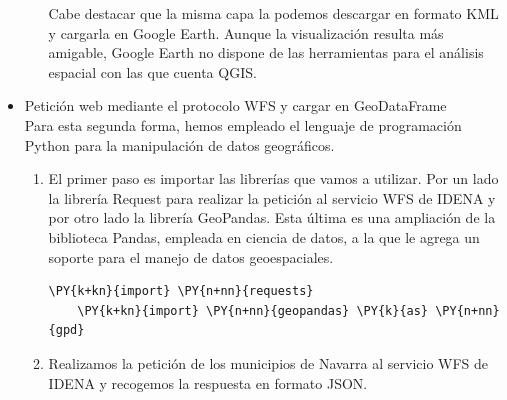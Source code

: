 \begin{itemize}
\begin{enumerate}
        Cabe destacar que la misma capa la podemos descargar en formato KML y cargarla en Google Earth. 
        Aunque la visualización resulta más amigable, Google Earth no dispone de las herramientas para el análisis espacial con las que cuenta QGIS.
    \end{enumerate}

    \newpage

    \item Petición web mediante el protocolo WFS y cargar en GeoDataFrame\\
    Para esta segunda forma, hemos empleado el lenguaje de programación Python para la manipulación de datos geográficos.
    
    \begin{enumerate}
        \item El primer paso es importar las librerías que vamos a utilizar.
        Por un lado la librería Request para realizar la petición al servicio WFS de IDENA y por otro lado la librería GeoPandas.
        Esta última es una ampliación de la biblioteca Pandas, empleada en ciencia de datos, a la que le agrega un soporte para el manejo de datos geoespaciales.

\begin{tcolorbox}[breakable, size=fbox, boxrule=1pt, colback=cellbackground, colframe=cellborder, fontupper=\footnotesize]
    \begin{Verbatim}[commandchars=\\\{\}]
    \PY{k+kn}{import} \PY{n+nn}{requests}
    \PY{k+kn}{import} \PY{n+nn}{geopandas} \PY{k}{as} \PY{n+nn}{gpd}
    \end{Verbatim}
\end{tcolorbox}

        \item Realizamos la petición de los municipios de Navarra al servicio WFS de IDENA y recogemos la respuesta en formato JSON.


\end{enumerate}
\end{itemize}
